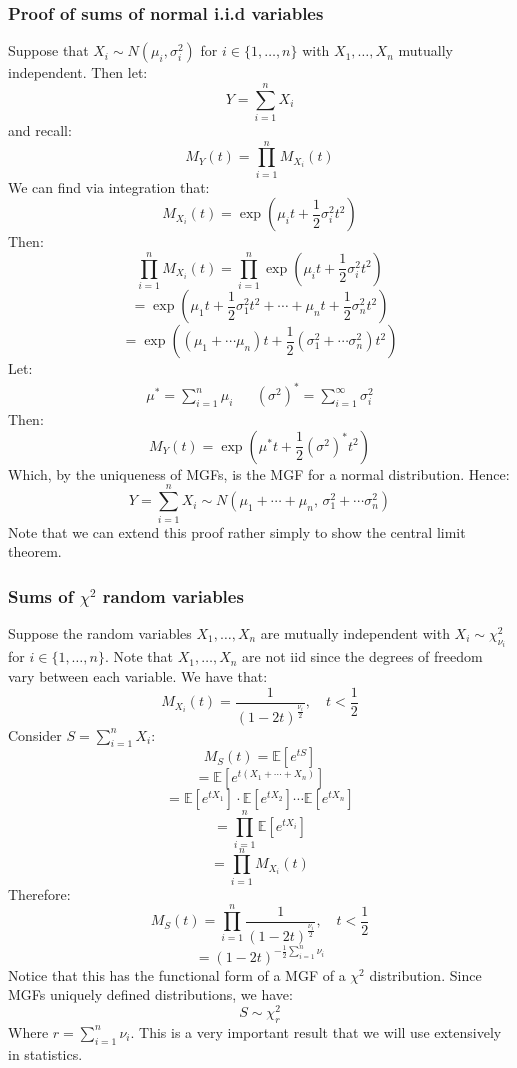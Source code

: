 \documentclass[12pt]{article}
\begin{document}
\subsubsection{Proof of sums of normal i.i.d variables}
Suppose that \(X_i\sim N(\mu_i,\sigma^2_i)\) for \(i\in\{1,\dots,n\}\) with \(X_1,\dots, X_n\) mutually independent. Then let:
\[Y=\sum^n_{i=1}X_i\]
and recall:
\[M_Y(t)=\prod^n_{i=1}M_{X_i}(t)\]
We can find via integration that:
\[M_{X_i}(t)=\exp\left(\mu_i t+\frac{1}{2}\sigma_i^2t^2\right)\]
Then:
\[\prod^n_{i=1}M_{X_i}(t)=\prod^n_{i=1}\exp\left(\mu_it+\frac{1}{2}\sigma_i^2t^2\right)\]
\[=\exp\left(\mu_1t+\frac{1}{2}\sigma_1^2t^2+\cdots+\mu_nt+\frac{1}{2}\sigma_n^2t^2\right)\]
\[=\exp\left((\mu_1+\cdots\mu_n)t+\frac{1}{2}(\sigma_1^2+\cdots\sigma^2_n)t^2\right)\]
Let:
\begin{align*}
    \mu^*=\sum^n_{i=1}\mu_i&&(\sigma^{2})^*=\sum^\infty_{i=1}\sigma^2_i
\end{align*}
Then:
\[M_Y(t)=\exp\left(\mu^*t+\frac{1}{2}(\sigma^2)^*t^2\right)\]
Which, by the uniqueness of MGFs, is the MGF for a normal distribution. Hence:
\[Y=\sum^n_{i=1}X_i\sim N(\mu_1+\cdots+\mu_n,\, \sigma^2_1+\cdots\sigma^2_n)\]
Note that we can extend this proof rather simply to show the central limit theorem.
\subsubsection{Sums of \(\chi^2\) random variables}
Suppose the random variables \(X_1,\dots,X_n\) are mutually independent with \(X_i\sim\chi^2_{\nu_i}\) for \(i\in\{1,\dots,n\}\). Note that \(X_1,\dots,X_n\) are not iid since the degrees of freedom vary between each variable. We have that:
\[M_{X_i}(t)=\frac{1}{(1-2t)^{\frac{\nu_i}{2}}},\quad t<\frac{1}{2}\]
Consider \(S=\sum^n_{i=1}X_i\):
\[M_S(t)=\mathbb{E}[e^{tS}]\]
\[=\mathbb{E}[e^{t(X_1+\cdots+X_n)}]\]
\[=\mathbb{E}[e^{tX_1}]\cdot\mathbb{E}[e^{tX_2}]\cdots\mathbb{E}[e^{tX_n}]\]
\[=\prod^n_{i=1}\mathbb{E}[e^{tX_i}]\]
\[=\prod^n_{i=1}M_{X_i}(t)\]
Therefore:
\[M_S(t)=\prod^n_{i=1}\frac{1}{(1-2t)^{\frac{\nu_i}{2}}},\quad t<\frac{1}{2}\]
\[=(1-2t)^{-\frac{1}{2}\sum^n_{i=1}\nu_i}\]
Notice that this has the functional form of a MGF of a \(\chi^2\) distribution. Since MGFs uniquely defined distributions, we have:
\[S\sim\chi^2_r\]
Where \(r=\sum^n_{i=1}\nu_i\). This is a very important result that we will use extensively in statistics.
\end{document}
